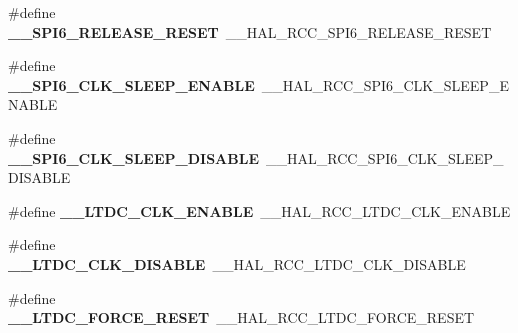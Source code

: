 \begin{DoxyCompactItemize}
\item 
\hypertarget{group___h_a_l___r_c_c___aliased_gaa4d1b74364d9122068fb087811bbdfcf}{\#define {\bfseries \-\_\-\-\_\-\-S\-P\-I6\-\_\-\-R\-E\-L\-E\-A\-S\-E\-\_\-\-R\-E\-S\-E\-T}~\-\_\-\-\_\-\-H\-A\-L\-\_\-\-R\-C\-C\-\_\-\-S\-P\-I6\-\_\-\-R\-E\-L\-E\-A\-S\-E\-\_\-\-R\-E\-S\-E\-T}\label{group___h_a_l___r_c_c___aliased_gaa4d1b74364d9122068fb087811bbdfcf}

\item 
\hypertarget{group___h_a_l___r_c_c___aliased_gab55448bad296383401e9fa959560e3f1}{\#define {\bfseries \-\_\-\-\_\-\-S\-P\-I6\-\_\-\-C\-L\-K\-\_\-\-S\-L\-E\-E\-P\-\_\-\-E\-N\-A\-B\-L\-E}~\-\_\-\-\_\-\-H\-A\-L\-\_\-\-R\-C\-C\-\_\-\-S\-P\-I6\-\_\-\-C\-L\-K\-\_\-\-S\-L\-E\-E\-P\-\_\-\-E\-N\-A\-B\-L\-E}\label{group___h_a_l___r_c_c___aliased_gab55448bad296383401e9fa959560e3f1}

\item 
\hypertarget{group___h_a_l___r_c_c___aliased_ga16c38d6834e985f3466c21b9d3b68da2}{\#define {\bfseries \-\_\-\-\_\-\-S\-P\-I6\-\_\-\-C\-L\-K\-\_\-\-S\-L\-E\-E\-P\-\_\-\-D\-I\-S\-A\-B\-L\-E}~\-\_\-\-\_\-\-H\-A\-L\-\_\-\-R\-C\-C\-\_\-\-S\-P\-I6\-\_\-\-C\-L\-K\-\_\-\-S\-L\-E\-E\-P\-\_\-\-D\-I\-S\-A\-B\-L\-E}\label{group___h_a_l___r_c_c___aliased_ga16c38d6834e985f3466c21b9d3b68da2}

\item 
\hypertarget{group___h_a_l___r_c_c___aliased_gad84cdc420c9416fde8536d43f12b9807}{\#define {\bfseries \-\_\-\-\_\-\-L\-T\-D\-C\-\_\-\-C\-L\-K\-\_\-\-E\-N\-A\-B\-L\-E}~\-\_\-\-\_\-\-H\-A\-L\-\_\-\-R\-C\-C\-\_\-\-L\-T\-D\-C\-\_\-\-C\-L\-K\-\_\-\-E\-N\-A\-B\-L\-E}\label{group___h_a_l___r_c_c___aliased_gad84cdc420c9416fde8536d43f12b9807}

\item 
\hypertarget{group___h_a_l___r_c_c___aliased_ga36beee830404c49d03697162869ec113}{\#define {\bfseries \-\_\-\-\_\-\-L\-T\-D\-C\-\_\-\-C\-L\-K\-\_\-\-D\-I\-S\-A\-B\-L\-E}~\-\_\-\-\_\-\-H\-A\-L\-\_\-\-R\-C\-C\-\_\-\-L\-T\-D\-C\-\_\-\-C\-L\-K\-\_\-\-D\-I\-S\-A\-B\-L\-E}\label{group___h_a_l___r_c_c___aliased_ga36beee830404c49d03697162869ec113}

\item 
\hypertarget{group___h_a_l___r_c_c___aliased_ga768b510b2c77d1d9e28b8cba9ed5ae76}{\#define {\bfseries \-\_\-\-\_\-\-L\-T\-D\-C\-\_\-\-F\-O\-R\-C\-E\-\_\-\-R\-E\-S\-E\-T}~\-\_\-\-\_\-\-H\-A\-L\-\_\-\-R\-C\-C\-\_\-\-L\-T\-D\-C\-\_\-\-F\-O\-R\-C\-E\-\_\-\-R\-E\-S\-E\-T}\label{group___h_a_l___r_c_c___aliased_ga768b510b2c77d1d9e28b8cba9ed5ae76}


\end{DoxyCompactItemize}

